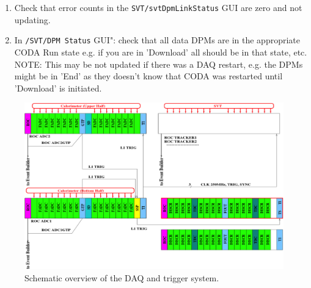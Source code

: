 \documentclass[12pt]{article}
\begin{document}
\begin{enumerate}
\begin{enumerate}
\item
Check that error counts in the \texttt{SVT/svtDpmLinkStatus} GUI are zero and not updating.

\item
In \texttt{/SVT/DPM Status} GUI": check that all data DPMs are in the appropriate CODA Run state e.g. if you are in 'Download' all should be in that state, etc. 
\newline NOTE: This may be not updated if there was a DAQ restart, e.g. the DPMs might be in 'End' as they doesn't know that CODA was restarted until 'Download' is initiated.
\end{enumerate}
\end{enumerate}




\begin{figure}[htbp]
\begin{center}
    \includegraphics[width=\textwidth]{daq.png}
\caption{Schematic overview of the DAQ and trigger system.}
\label{fig:daq}
\end{center}
\end{figure}
\end{document}
